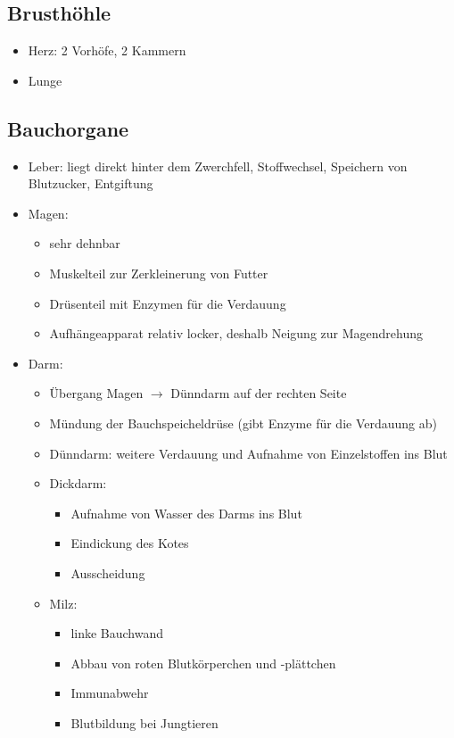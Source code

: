     \subsection{Brusthöhle}
    \begin{itemize}
        \item Herz: 2 Vorhöfe, 2 Kammern
        \item Lunge
    \end{itemize}

    \subsection{Bauchorgane}
    \begin{itemize}
        \item Leber: liegt direkt hinter dem Zwerchfell, Stoffwechsel, Speichern von Blutzucker, Entgiftung
        \item Magen:
        \begin{itemize}
            \item sehr dehnbar
            \item Muskelteil zur Zerkleinerung von Futter
            \item Drüsenteil mit Enzymen für die Verdauung
            \item Aufhängeapparat relativ locker, deshalb Neigung zur Magendrehung
        \end{itemize}
        \item Darm:
        \begin{itemize}
            \item Übergang Magen $\rightarrow$ Dünndarm auf der rechten Seite
            \item Mündung der Bauchspeicheldrüse (gibt Enzyme für die Verdauung ab)
            \item Dünndarm: weitere Verdauung und Aufnahme von Einzelstoffen ins Blut
            \item Dickdarm:
            \begin{itemize}
                \item Aufnahme von Wasser des Darms ins Blut
                \item Eindickung des Kotes
                \item Ausscheidung
            \end{itemize}
            \item Milz:
            \begin{itemize}
                \item linke Bauchwand
                \item Abbau von roten Blutkörperchen und -plättchen
                \item Immunabwehr
                \item Blutbildung bei Jungtieren
            \end{itemize}
        \end{itemize}
    \end{itemize}

